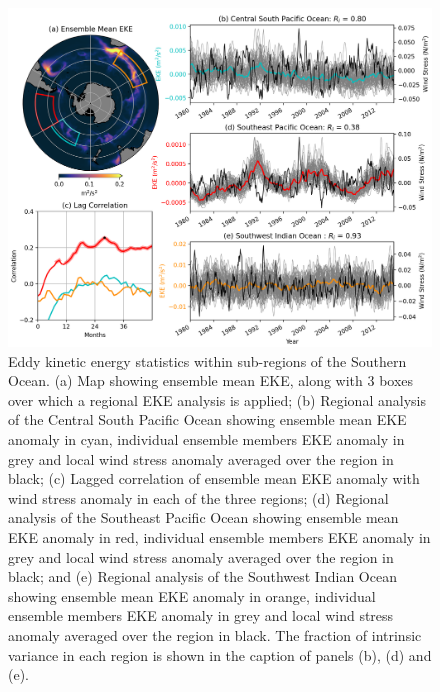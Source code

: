 \documentclass[linenumbers]{agujournal2019}
\begin{document}
\begin{figure}[t]
\begin{center}
\includegraphics[width=\hsize]{Figure4}
\caption{Eddy kinetic energy statistics within sub-regions of the Southern Ocean. (a) Map showing ensemble mean EKE, along with 3 boxes over which a regional EKE analysis is applied; (b) Regional analysis of the Central South Pacific Ocean showing ensemble mean EKE anomaly in cyan, individual ensemble members EKE anomaly in grey and local wind stress anomaly averaged over the region in black; (c) Lagged correlation of ensemble mean EKE anomaly with wind stress anomaly in each of the three regions; (d) Regional analysis of the Southeast Pacific Ocean showing ensemble mean EKE anomaly in red, individual ensemble members EKE anomaly in grey and local wind stress anomaly averaged over the region in black; and (e) Regional analysis of the Southwest Indian  Ocean showing ensemble mean EKE anomaly in orange, individual ensemble members EKE anomaly in grey and local wind stress anomaly averaged over the region in black. The fraction of intrinsic variance in each region is shown in the caption of panels (b), (d) and (e).}
\label{Fig:4}
\end{center}
\end{figure}
\end{document}
